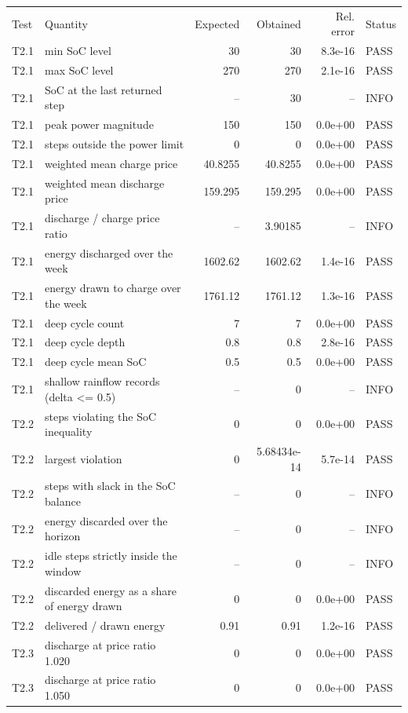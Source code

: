 \begin{tabular}{llrrrl}
\hline\noalign{\smallskip}
Test & Quantity & Expected & Obtained & Rel. error & Status \\
\noalign{\smallskip}\hline\noalign{\smallskip}
T2.1 & min SoC level & 30 & 30 & 8.3e-16 & PASS \\
T2.1 & max SoC level & 270 & 270 & 2.1e-16 & PASS \\
T2.1 & SoC at the last returned step & -- & 30 & -- & INFO \\
T2.1 & peak power magnitude & 150 & 150 & 0.0e+00 & PASS \\
T2.1 & steps outside the power limit & 0 & 0 & 0.0e+00 & PASS \\
T2.1 & weighted mean charge price & 40.8255 & 40.8255 & 0.0e+00 & PASS \\
T2.1 & weighted mean discharge price & 159.295 & 159.295 & 0.0e+00 & PASS \\
T2.1 & discharge / charge price ratio & -- & 3.90185 & -- & INFO \\
T2.1 & energy discharged over the week & 1602.62 & 1602.62 & 1.4e-16 & PASS \\
T2.1 & energy drawn to charge over the week & 1761.12 & 1761.12 & 1.3e-16 & PASS \\
T2.1 & deep cycle count & 7 & 7 & 0.0e+00 & PASS \\
T2.1 & deep cycle depth & 0.8 & 0.8 & 2.8e-16 & PASS \\
T2.1 & deep cycle mean SoC & 0.5 & 0.5 & 0.0e+00 & PASS \\
T2.1 & shallow rainflow records (delta <= 0.5) & -- & 0 & -- & INFO \\
T2.2 & steps violating the SoC inequality & 0 & 0 & 0.0e+00 & PASS \\
T2.2 & largest violation & 0 & 5.68434e-14 & 5.7e-14 & PASS \\
T2.2 & steps with slack in the SoC balance & -- & 0 & -- & INFO \\
T2.2 & energy discarded over the horizon & -- & 0 & -- & INFO \\
T2.2 & idle steps strictly inside the window & -- & 0 & -- & INFO \\
T2.2 & discarded energy as a share of energy drawn & 0 & 0 & 0.0e+00 & PASS \\
T2.2 & delivered / drawn energy & 0.91 & 0.91 & 1.2e-16 & PASS \\
T2.3 & discharge at price ratio 1.020 & 0 & 0 & 0.0e+00 & PASS \\
T2.3 & discharge at price ratio 1.050 & 0 & 0 & 0.0e+00 & PASS \\

\end{tabular}
